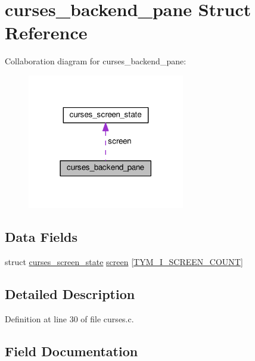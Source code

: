 \hypertarget{structcurses__backend__pane}{}\section{curses\+\_\+backend\+\_\+pane Struct Reference}
\label{structcurses__backend__pane}


Collaboration diagram for curses\+\_\+backend\+\_\+pane\+:
\nopagebreak
\begin{figure}[H]
\begin{center}
\leavevmode
\includegraphics[width=194pt]{structcurses__backend__pane__coll__graph}
\end{center}
\end{figure}
\subsection*{Data Fields}
\begin{DoxyCompactItemize}
\item 
struct \hyperlink{structcurses__screen__state}{curses\+\_\+screen\+\_\+state} \hyperlink{structcurses__backend__pane_a02234fc4e1f0116f10eafc07307be50c}{screen} \mbox{[}\hyperlink{pane_8h_a49f1d9b192f4f01ff444123abde24761a4675b455ce9ebdc1c317e91e0c66e5e0}{T\+Y\+M\+\_\+\+I\+\_\+\+S\+C\+R\+E\+E\+N\+\_\+\+C\+O\+U\+NT}\mbox{]}
\end{DoxyCompactItemize}


\subsection{Detailed Description}


Definition at line 30 of file curses.\+c.



\subsection{Field Documentation}
\mbox{\label{structcurses__backend__pane_a02234fc4e1f0116f10eafc07307be50c}} 
